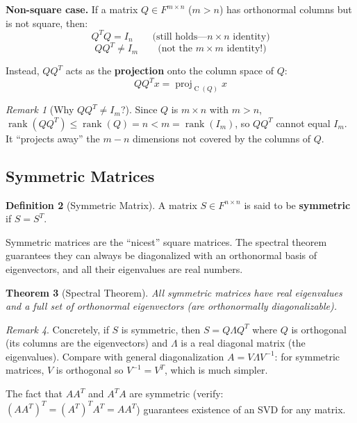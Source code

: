\documentclass[11pt]{article}
\theoremstyle{definition}
\newtheorem{definition}{Definition}[section]
\theoremstyle{plain}
\newtheorem{theorem}[definition]{Theorem}
\theoremstyle{remark}
\newtheorem{remark}[definition]{Remark}
\DeclareMathOperator{\proj}{proj}
\DeclareMathOperator{\rank}{rank}
\DeclareMathOperator{\Col}{C}
\begin{document}
\textbf{Non-square case.} If a matrix $Q \in F^{m \times n}$ ($m > n$) has orthonormal columns but is not square, then:
\[
Q^T Q = I_n \qquad \text{(still holds---$n \times n$ identity)}
\]
\[
QQ^T \neq I_m \qquad \text{(not the $m \times m$ identity!)}
\]

Instead, $QQ^T$ acts as the \textbf{projection} onto the column space of $Q$:
\[
QQ^T x = \proj_{\Col(Q)} x
\]

\begin{remark}[Why $QQ^T \neq I_m$?]
Since $Q$ is $m \times n$ with $m > n$, $\rank(QQ^T) \leq \rank(Q) = n < m = \rank(I_m)$, so $QQ^T$ cannot equal $I_m$. It ``projects away'' the $m - n$ dimensions not covered by the columns of $Q$.
\end{remark}

\subsection{Symmetric Matrices}

\begin{definition}[Symmetric Matrix]
A matrix $S \in F^{n \times n}$ is said to be \textbf{symmetric} if $S = S^T$.
\end{definition}

\begin{intuitionbox}
Symmetric matrices are the ``nicest'' square matrices. The spectral theorem guarantees they can always be diagonalized with an orthonormal basis of eigenvectors, and all their eigenvalues are real numbers.
\end{intuitionbox}

\begin{theorem}[Spectral Theorem]
All symmetric matrices have real eigenvalues and a full set of orthonormal eigenvectors (are orthonormally diagonalizable).
\end{theorem}

\begin{remark}
Concretely, if $S$ is symmetric, then $S = Q\Lambda Q^T$ where $Q$ is orthogonal (its columns are the eigenvectors) and $\Lambda$ is a real diagonal matrix (the eigenvalues). Compare with general diagonalization $A = V\Lambda V^{-1}$: for symmetric matrices, $V$ is orthogonal so $V^{-1} = V^T$, which is much simpler.
\end{remark}

The fact that $AA^T$ and $A^T A$ are symmetric (verify: $(AA^T)^T = (A^T)^T A^T = AA^T$) guarantees existence of an SVD for any matrix.
\end{document}
